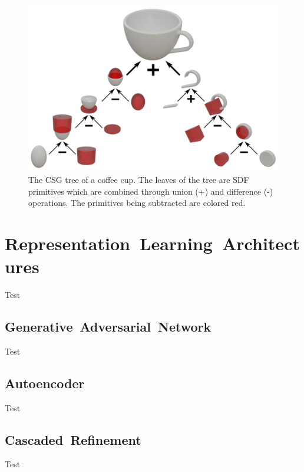 \begin{figure}[h]
	\centering
	\includegraphics[scale=0.5]{Images/CSG Cup}
	\caption{The CSG tree of a coffee cup. The leaves of the tree are SDF primitives which are combined through union (+) and difference (-) operations. The primitives being subtracted are colored red.}
	\label{fig:csg_cup}
\end{figure}


\section{Representation~Learning~Architectures}
\label{sec:representation_learning_architectures}

Test

\subsection{Generative~Adversarial~Network}
\label{subsec:generative_adversarial_networks}

Test

\subsection{Autoencoder}
\label{subsec:autoencoders}

Test

\subsection{Cascaded~Refinement}
\label{subsec:cascaded_refinement}

Test